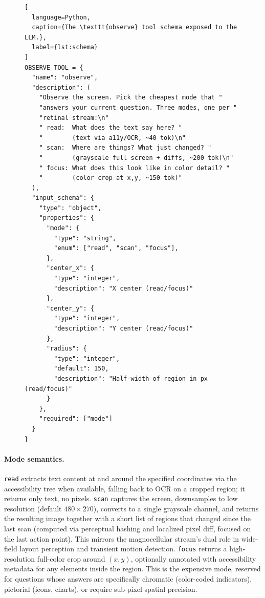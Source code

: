 \documentclass[11pt,a4paper]{article}
\begin{document}
\begin{figure}[t]
\begin{lstlisting}[
  language=Python,
  caption={The \texttt{observe} tool schema exposed to the LLM.},
  label={lst:schema}
]
OBSERVE_TOOL = {
  "name": "observe",
  "description": (
    "Observe the screen. Pick the cheapest mode that "
    "answers your current question. Three modes, one per "
    "retinal stream:\n"
    " read:  What does the text say here? "
    "        (text via a11y/OCR, ~40 tok)\n"
    " scan:  Where are things? What just changed? "
    "        (grayscale full screen + diffs, ~200 tok)\n"
    " focus: What does this look like in color detail? "
    "        (color crop at x,y, ~150 tok)"
  ),
  "input_schema": {
    "type": "object",
    "properties": {
      "mode": {
        "type": "string",
        "enum": ["read", "scan", "focus"],
      },
      "center_x": {
        "type": "integer",
        "description": "X center (read/focus)"
      },
      "center_y": {
        "type": "integer",
        "description": "Y center (read/focus)"
      },
      "radius": {
        "type": "integer",
        "default": 150,
        "description": "Half-width of region in px (read/focus)"
      }
    },
    "required": ["mode"]
  }
}
\end{lstlisting}
\end{figure}

\paragraph{Mode semantics.}
\texttt{read} extracts text content at and around the specified coordinates
via the accessibility tree when available, falling back to OCR on a cropped
region; it returns only text, no pixels.
\texttt{scan} captures the screen, downsamples to low resolution (default
$480 \times 270$), converts to a single grayscale channel, and returns the
resulting image together with a short list of regions that changed since the
last scan (computed via perceptual hashing and localized pixel diff, focused on
the last action point). This mirrors the magnocellular stream's dual role in
wide-field layout perception and transient motion detection.
\texttt{focus} returns a high-resolution full-color crop around $(x, y)$,
optionally annotated with accessibility metadata for any elements inside the
region. This is the expensive mode, reserved for questions whose answers are
specifically chromatic (color-coded indicators), pictorial (icons, charts), or
require sub-pixel spatial precision.
\end{document}
